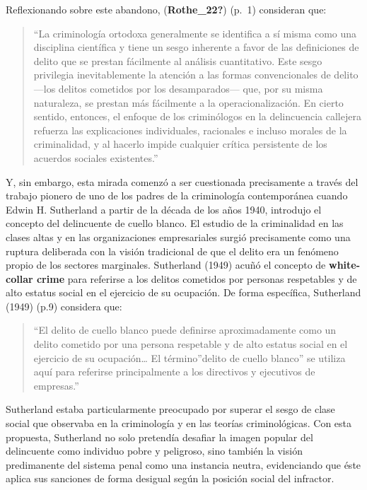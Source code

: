 \documentclass[
  spanish,
  letterpaper,
  DIV=11,
  numbers=noendperiod]{scrreprt}
\begin{document}
Reflexionando sobre este abandono, (\textbf{Rothe\_22?}) (p.~1)
consideran que:

\begin{quote}
``La criminología ortodoxa generalmente se identifica a sí misma como
una disciplina científica y tiene un sesgo inherente a favor de las
definiciones de delito que se prestan fácilmente al análisis
cuantitativo. Este sesgo privilegia inevitablemente la atención a las
formas convencionales de delito ---los delitos cometidos por los
desamparados--- que, por su misma naturaleza, se prestan más fácilmente
a la operacionalización. En cierto sentido, entonces, el enfoque de los
criminólogos en la delincuencia callejera refuerza las explicaciones
individuales, racionales e incluso morales de la criminalidad, y al
hacerlo impide cualquier crítica persistente de los acuerdos sociales
existentes.''
\end{quote}

Y, sin embargo, esta mirada comenzó a ser cuestionada precisamente a
través del trabajo pionero de uno de los padres de la criminología
contemporánea cuando Edwin H. Sutherland a partir de la década de los
años 1940, introdujo el concepto del delincuente de cuello blanco. El
estudio de la criminalidad en las clases altas y en las organizaciones
empresariales surgió precisamente como una ruptura deliberada con la
visión tradicional de que el delito era un fenómeno propio de los
sectores marginales. Sutherland (1949) acuñó el concepto de
\textbf{white-collar crime} para referirse a los delitos cometidos por
personas respetables y de alto estatus social en el ejercicio de su
ocupación. De forma específica, Sutherland (1949) (p.9) considera que:

\begin{quote}
``El delito de cuello blanco puede definirse aproximadamente como un
delito cometido por una persona respetable y de alto estatus social en
el ejercicio de su ocupación\ldots{} El término''delito de cuello
blanco'' se utiliza aquí para referirse principalmente a los directivos
y ejecutivos de empresas.''
\end{quote}

Sutherland estaba particularmente preocupado por superar el sesgo de
clase social que observaba en la criminología y en las teorías
criminológicas. Con esta propuesta, Sutherland no solo pretendía
desafiar la imagen popular del delincuente como individuo pobre y
peligroso, sino también la visión predimanente del sistema penal como
una instancia neutra, evidenciando que éste aplica sus sanciones de
forma desigual según la posición social del infractor.
\end{document}
